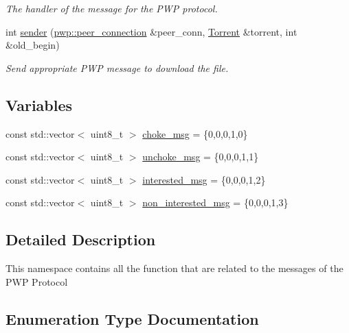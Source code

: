 \begin{DoxyCompactItemize}
\begin{DoxyCompactList}\small\item\em The handler of the message for the P\+WP protocol. \end{DoxyCompactList}\item 
int \hyperlink{namespacepwp__msg_ab578b213d293636d33efc24382f16b25}{sender} (\hyperlink{structpwp_1_1peer__connection}{pwp\+::peer\+\_\+connection} \&peer\+\_\+conn, \hyperlink{structtorr_1_1Torrent}{Torrent} \&torrent, int \&old\+\_\+begin)
\begin{DoxyCompactList}\small\item\em Send appropriate P\+WP message to download the file. \end{DoxyCompactList}\end{DoxyCompactItemize}
\subsection*{Variables}
\begin{DoxyCompactItemize}
\item 
const std\+::vector$<$ uint8\+\_\+t $>$ \hyperlink{namespacepwp__msg_a695ee2efb59a7c258559f19440fe6998}{choke\+\_\+msg} = \{0,0,0,1,0\}
\item 
const std\+::vector$<$ uint8\+\_\+t $>$ \hyperlink{namespacepwp__msg_acdc5eb698534e84a15db0e061c511e7c}{unchoke\+\_\+msg} = \{0,0,0,1,1\}
\item 
const std\+::vector$<$ uint8\+\_\+t $>$ \hyperlink{namespacepwp__msg_afc68b17ce131c52fa0beb0cc7185778b}{interested\+\_\+msg} = \{0,0,0,1,2\}
\item 
const std\+::vector$<$ uint8\+\_\+t $>$ \hyperlink{namespacepwp__msg_a16a5f22f784d872342a82af9f6b77830}{non\+\_\+interested\+\_\+msg} = \{0,0,0,1,3\}
\end{DoxyCompactItemize}


\subsection{Detailed Description}
This namespace contains all the function that are related to the messages of the P\+WP Protocol 

\subsection{Enumeration Type Documentation}
\mbox{\label{namespacepwp__msg_a0b9a29508f00a30e5138d2b78f4b1daf}} 
